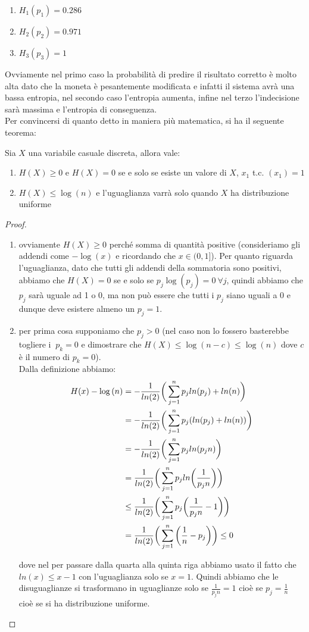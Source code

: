 \begin{enumerate}
\item$H_1(p_1)=0.286$
\item$H_2(p_2)=0.971$
\item$H_3(p_3)=1$
\end{enumerate}
Ovviamente nel primo caso la probabilità di predire il risultato corretto è molto alta dato che la moneta è pesantemente modificata e infatti il sistema avrà una bassa entropia, nel secondo caso l'entropia aumenta, infine nel terzo l'indecisione sarà massima e l'entropia di conseguenza.\\
Per convincersi di quanto detto in maniera più matematica, si ha il seguente teorema:
\begin{teo} \label{teo:6.2}
Sia $X$ una variabile casuale discreta, allora vale:
\begin{enumerate}
\item $H(X)\geq 0$ e $H(X)= 0$ se e solo se esiste un valore di $X$, $x_1$ t.c. \p$(x_1)=1$
\item $H(X)\leq \log{(n)}$ e l'uguaglianza varrà solo quando $X$ ha distribuzione uniforme
\end{enumerate}
\end{teo}
\begin{proof} \leavevmode 
\begin{enumerate}
\item ovviamente $H(X)\geq 0$ perché somma di quantità positive (consideriamo gli addendi come $-\log(x)$ e ricordando che $x\in (0,1]$). Per quanto riguarda l'uguaglianza, dato che tutti gli addendi della sommatoria sono positivi, abbiamo che $H(X)=0$ se e solo se $p_j\log(p_j)=0 \  \forall j$, quindi abbiamo che $p_j$ sarà uguale ad 1 o 0, ma non può essere che tutti i $p_j$ siano  uguali a 0 e dunque deve esistere almeno un $p_j=1$.
\item  per prima cosa supponiamo che $p_j > 0$ (nel caso non lo fossero basterebbe togliere i $\  p_k=0$ e dimostrare che $H(X)\leq \log(n-c)\leq \log(n)$ dove $c$ è il numero di $p_k=0$).\\
Dalla definizione abbiamo:
\[
\begin{split}
H(x)-\log{(n)}
&=-\frac{1}{ln(2)} \bigg( \sum_{j=1}^n p_j ln (p_j) + ln(n) \bigg)\\
&=-\frac{1}{ln(2)} \bigg( \sum_{j=1}^n p_j (ln (p_j) + ln(n)) \bigg)\\
&=-\frac{1}{ln(2)} \bigg( \sum_{j=1}^n p_j ln(p_jn)\bigg)\\
&=\frac{1}{ln(2)} \bigg( \sum_{j=1}^n p_j ln \bigg( \frac{1}{p_jn} \bigg) \bigg)\\
&\leq \frac{1}{ln(2)} \bigg( \sum_{j=1}^n p_j \bigg( \frac{1}{p_jn} -1 \bigg) \bigg)\\
&= \frac{1}{ln(2)} \bigg( \sum_{j=1}^n \bigg( \frac{1}{n} -p_j \bigg) \bigg) \leq 0
\end{split}
\]


dove nel per passare dalla quarta alla quinta riga abbiamo usato il fatto che $ln(x)\leq x-1$ con l'uguaglianza solo se $x=1$. Quindi abbiamo che le disuguaglianze si trasformano in uguaglianze solo se $\frac{1}{p_jn}=1$ cioè se $p_j=\frac{1}{n}$ cioè se si ha distribuzione uniforme.
\end{enumerate}
\end{proof}
